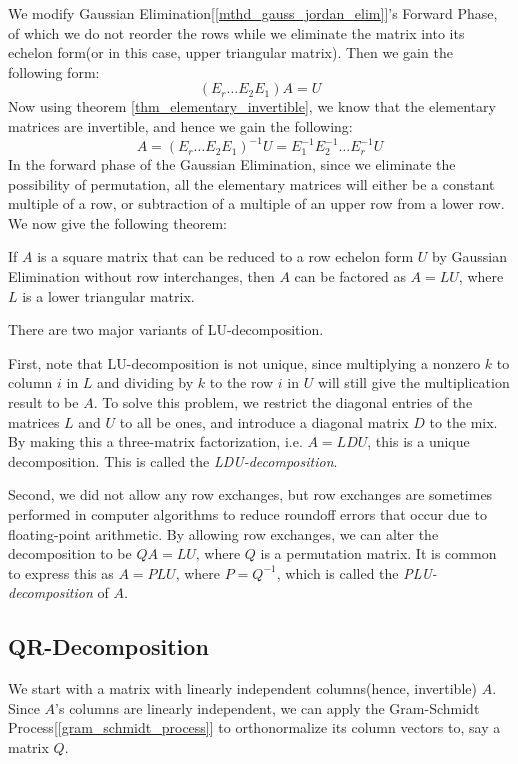 \documentclass{report}
\begin{document}
			We modify Gaussian Elimination[\ref{mthd_gauss_jordan_elim}]'s Forward Phase, of which we do not reorder the rows while we eliminate the matrix into its echelon form(or in this case, upper triangular matrix). Then we gain the following form:
			\begin{displaymath}
				(E_r\dots E_2E_1)A=U
			\end{displaymath}
			Now using theorem \ref{thm_elementary_invertible}, we know that the elementary matrices are invertible, and hence we gain the following:
			\begin{displaymath}
				A=(E_r\dots E_2E_1)^{-1}U=E_1^{-1}E_2^{-1}\dots E_r^{-1}U
			\end{displaymath}
			In the forward phase of the Gaussian Elimination, since we eliminate the possibility of permutation, all the elementary matrices will either be a constant multiple of a row, or subtraction of a multiple of an upper row from a lower row. We now give the following theorem:
			\begin{thm}
				If $A$ is a square matrix that can be reduced to a row echelon form $U$ by Gaussian Elimination without row interchanges, then $A$ can be factored as $A=LU$, where $L$ is a lower triangular matrix.
			\end{thm}
			
			There are two major variants of LU-decomposition.
			
			First, note that LU-decomposition is not unique, since multiplying a nonzero $k$ to column $i$ in $L$ and dividing by $k$ to the row $i$ in $U$ will still give the multiplication result to be $A$. To solve this problem, we restrict the diagonal entries of the matrices $L$ and $U$ to all be ones, and introduce a diagonal matrix $D$ to the mix. By making this a three-matrix factorization, i.e. $A=LDU$, this is a unique decomposition. This is called the \emph{LDU-decomposition}.
			
			Second, we did not allow any row exchanges, but row exchanges are sometimes performed in computer algorithms to reduce roundoff errors that occur due to floating-point arithmetic. By allowing row exchanges, we can alter the decomposition to be $QA=LU$, where $Q$ is a permutation matrix. It is common to express this as $A=PLU$, where $P=Q^{-1}$, which is called the \emph{PLU-decomposition} of $A$.
		
		\subsection{QR-Decomposition}
			We start with a matrix with linearly independent columns(hence, invertible) $A$. Since $A$'s columns are linearly independent, we can apply the Gram-Schmidt Process[\ref{gram_schmidt_process}] to orthonormalize its column vectors to, say a matrix $Q$.
			
\end{document}
